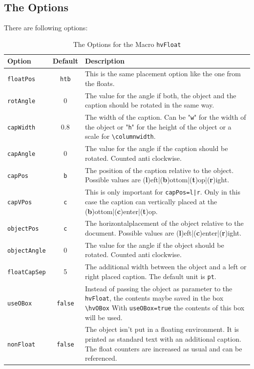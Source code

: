 \documentclass{scrartcl}
\begin{document}
\subsection{The Options}
There are following options:\\[1ex]
\begin{table}[!htb]
\caption{The Options for the Macro \texttt{hvFloat}}\label{tab:options}
\begin{tabularx}{\textwidth}{lcX}\hline
Option & Default &Description\\\hline
\texttt{floatPos} & \texttt{htb} & This is the same placement option like the one from the floats.\\
\texttt{rotAngle} & 0& The value for the angle if both, the object and the caption should be rotated in the same way.\\

\texttt{capWidth} & 0.8& The width of the caption. Can be "\texttt{w}" for the width of the object or "\texttt{h}" for the height of the object or a scale for \verb|\columnwidth|.\\

\texttt{capAngle} & 0 & The value for the angle if the caption should be rotated. Counted anti clockwise.\\

\texttt{capPos}& \texttt{b}& The position of the caption relative to the object. Possible values are (\textbf{l})eft|(\textbf{b})ottom|(\textbf{t})op|(\textbf{r})ight.\\

\texttt{capVPos}& \texttt{c}& This is only important for \texttt{capPos=l|r}. Only in this case the caption can vertically placed at the (\textbf{b})ottom|(\textbf{c})enter|(\textbf{t})op.\\

\texttt{objectPos} & \texttt{c} & The horizontalplacement of the object relative to the document. Possible values are (\textbf{l})eft|(\textbf{c})enter|(\textbf{r})ight.\\

\texttt{objectAngle} & 0 & The value for the angle if the object should be rotated. Counted anti clockwise.\\

\texttt{floatCapSep} & 5 & The additional width between the object and a left or right placed caption. The default unit is \texttt{pt}.\\

\texttt{useOBox} & \texttt{false} & Instead of passing the object as parameter to the \texttt{hvFloat}, the contents maybe saved in the box \texttt{\textbackslash hvOBox} With \texttt{useOBox=true} the contents of this box will be used.\\

\texttt{nonFloat} & \texttt{false} & The object isn't put in a floating environment. It is printed as standard text with an additional caption. The float counters are increased as usual and can be referenced.
\\\hline
\end{tabularx} 
\end{table}
 
\end{document}
